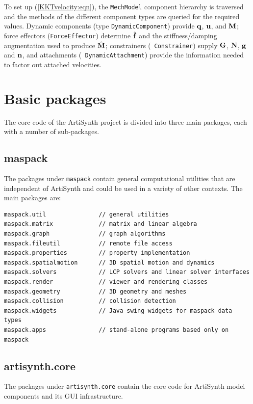 To set up (\ref{KKTvelocity:eqn}), the {\tt MechModel} component
hierarchy is traversed and the methods of the different component
types are queried for the required values.  Dynamic components (type
{\tt DynamicComponent}) provide ${\bf q}$, ${\bf u}$, and ${\bf M}$; force effectors
({\tt ForceEffector}) determine $\hat{{\bf f}}$ and the stiffness/damping
augmentation used to produce $\hat{{\bf M}}$; constrainers ({\tt
Constrainer}) supply ${\bf G}$, ${\bf N}$, ${\bf g}$ and ${\bf n}$, and attachments ({\tt
DynamicAttachment}) provide the information needed to factor out
attached velocities.

\section{Basic packages}

The core code of the ArtiSynth project is divided into three main
packages, each with a number of sub-packages.

\subsection{maspack}

The packages under {\tt maspack} contain general computational
utilities that are independent of ArtiSynth and could be
used in a variety of other contexts. The main packages are:

\begin{lstlisting}[]
maspack.util               // general utilities
maspack.matrix             // matrix and linear algebra
maspack.graph              // graph algorithms
maspack.fileutil           // remote file access 
maspack.properties         // property implementation
maspack.spatialmotion      // 3D spatial motion and dynamics
maspack.solvers            // LCP solvers and linear solver interfaces
maspack.render             // viewer and rendering classes
maspack.geometry           // 3D geometry and meshes
maspack.collision          // collision detection
maspack.widgets            // Java swing widgets for maspack data types 
maspack.apps               // stand-alone programs based only on maspack
\end{lstlisting}

\subsection{artisynth.core}

The packages under {\tt artisynth.core} contain the core code for
ArtiSynth model components and its GUI infrastructure.

